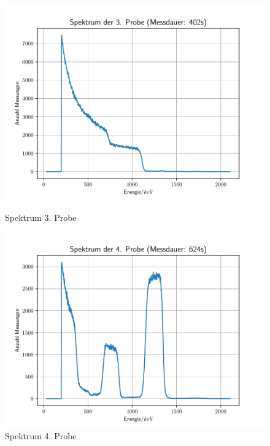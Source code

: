 \begin{figure}[htbp] 
	\begin{minipage}[t]{0.45\linewidth} 
     \includegraphics[scale=0.5]{3Probe.pdf}
  \caption{Spektrum 3. Probe}
  \label{Probe31}
\end{minipage}
\hfill
\begin{minipage}[t]{0.45\linewidth}  
     \includegraphics[scale=0.5]{4Probe.pdf}
  \caption{Spektrum 4. Probe}
  \label{Probe41}
\end{minipage}
\end{figure}

